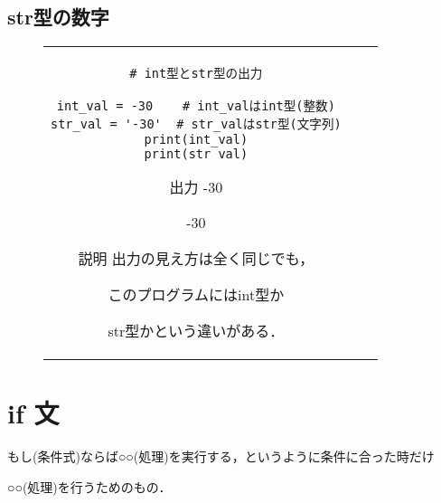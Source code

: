\documentclass{jsarticle}
\begin{document}
\subsection{str型の数字} \vspace{-5mm}
\begin{figure}[h]
	\begin{tabular}{ccc}
		\begin{minipage}[t]{.45\textwidth}
			\begin{lstlisting}[caption=int型とstr型]
# int型とstr型の出力

int_val = -30    # int_valはint型(整数)
str_val = '-30'  # str_valはstr型(文字列)
print(int_val)
print(str_val)
\end{lstlisting}
		\end{minipage} \hspace{5mm}
		\begin{minipage}[t]{.1\textwidth}
			\begin{itembox}[l]{出力}
				-30 \par
				-30
			\end{itembox}
		\end{minipage} \hspace{5mm}
		\begin{minipage}[t]{.35\textwidth}
			\begin{itembox}[l]{説明}
				出力の見え方は全く同じでも，\par このプログラムにはint型か\par str型かという違いがある．
			\end{itembox}
		\end{minipage}
	\end{tabular}
\end{figure}


\section{if 文}
もし(条件式)ならば○○(処理)を実行する，というように条件に合った時だけ \par ○○(処理)を行うためのもの．
\end{document}

